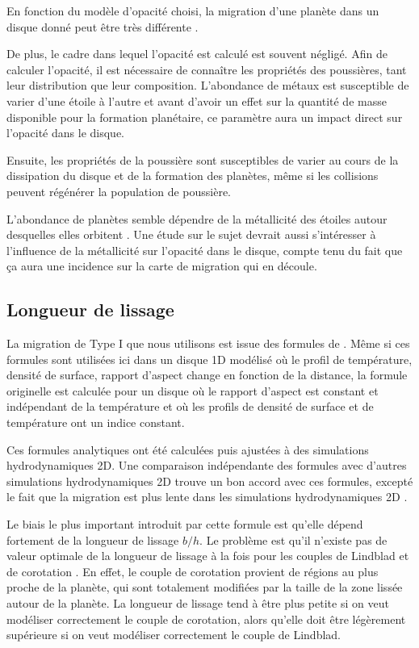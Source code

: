En fonction du modèle d'opacité choisi, la migration d'une planète dans un disque donné peut être très différente . 

De plus, le cadre dans lequel l'opacité est calculé est souvent négligé. Afin de calculer l'opacité, il est nécessaire de connaître les propriétés des poussières, tant leur distribution que leur composition. L'abondance de métaux est susceptible de varier d'une étoile à l'autre et avant d'avoir un effet sur la quantité de masse disponible pour la formation planétaire, ce paramètre aura un impact direct sur l'opacité dans le disque. 

Ensuite, les propriétés de la poussière sont susceptibles de varier au cours de la dissipation du disque et de la formation des planètes, même si les collisions peuvent régénérer la population de poussière.

L'abondance de planètes semble dépendre de la métallicité des étoiles autour desquelles elles orbitent \citep{fischer2005planet}. Une étude sur le sujet devrait aussi s'intéresser à l'influence de la métallicité sur l'opacité dans le disque, compte tenu du fait que ça aura une incidence sur la carte de migration qui en découle.

\subsection{Longueur de lissage}
La migration de Type I que nous utilisons est issue des formules de \cite{paardekooper2011torque}. Même si ces formules sont utilisées ici dans un disque 1D modélisé où le profil de température, densité de surface, rapport d'aspect change en fonction de la distance, la formule originelle est calculée pour un disque où le rapport d'aspect est constant et indépendant de la température et où les profils de densité de surface et de température ont un indice constant. 

Ces formules analytiques ont été calculées puis ajustées à des simulations hydrodynamiques 2D. Une comparaison indépendante des formules avec d'autres simulations hydrodynamiques 2D trouve un bon accord avec ces formules, excepté le fait que la migration est plus lente dans les simulations hydrodynamiques 2D \citep{pierens2013makingaccepted}. 

Le biais le plus important introduit par cette formule est qu'elle dépend fortement de la longueur de lissage $b/h$. Le problème est qu'il n'existe pas de valeur optimale de la longueur de lissage à la fois pour les couples de Lindblad et de corotation \citep{masset2002coorbital}. En effet, le couple de corotation provient de régions au plus proche de la planète, qui sont totalement modifiées par la taille de la zone lissée autour de la planète. La longueur de lissage tend à être plus petite si on veut modéliser correctement le couple de corotation, alors qu'elle doit être légèrement supérieure si on veut modéliser correctement le couple de Lindblad. 

